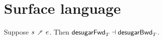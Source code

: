 \section{Surface language}











\begin{theorem}
  \label{thm:surface-language:desugar:gc}
     Suppose $s \dfwdarrow e$. Then $\mathsf{desugarFwd}_{T} \dashv \mathsf{desugarBwd}_{T}$.
\end{theorem}
